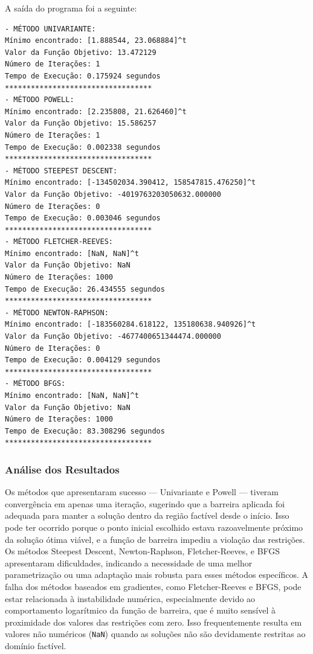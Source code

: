 \documentclass[a4paper, 12pt]{article}
\begin{document}
A saída do programa foi a seguinte:

\begin{verbatim}
- MÉTODO UNIVARIANTE:
Mínimo encontrado: [1.888544, 23.068884]^t
Valor da Função Objetivo: 13.472129
Número de Iterações: 1
Tempo de Execução: 0.175924 segundos
**********************************
- MÉTODO POWELL:
Mínimo encontrado: [2.235808, 21.626460]^t
Valor da Função Objetivo: 15.586257
Número de Iterações: 1
Tempo de Execução: 0.002338 segundos
**********************************
- MÉTODO STEEPEST DESCENT:
Mínimo encontrado: [-134502034.390412, 158547815.476250]^t
Valor da Função Objetivo: -4019763203050632.000000
Número de Iterações: 0
Tempo de Execução: 0.003046 segundos
**********************************
- MÉTODO FLETCHER-REEVES:
Mínimo encontrado: [NaN, NaN]^t
Valor da Função Objetivo: NaN
Número de Iterações: 1000
Tempo de Execução: 26.434555 segundos
**********************************
- MÉTODO NEWTON-RAPHSON:
Mínimo encontrado: [-183560284.618122, 135180638.940926]^t
Valor da Função Objetivo: -4677400651344474.000000
Número de Iterações: 0
Tempo de Execução: 0.004129 segundos
**********************************
- MÉTODO BFGS:
Mínimo encontrado: [NaN, NaN]^t
Valor da Função Objetivo: NaN
Número de Iterações: 1000
Tempo de Execução: 83.308296 segundos
**********************************
\end{verbatim}

\subsubsection{Análise dos Resultados}

Os métodos que apresentaram sucesso — Univariante e Powell — tiveram convergência em apenas uma iteração, sugerindo que a barreira aplicada foi adequada para manter a solução dentro da região factível desde o início. Isso pode ter ocorrido porque o ponto inicial escolhido estava razoavelmente próximo da solução ótima viável, e a função de barreira impediu a violação das restrições.\\

Os métodos Steepest Descent, Newton-Raphson, Fletcher-Reeves, e BFGS apresentaram dificuldades, indicando a necessidade de uma melhor parametrização ou uma adaptação mais robusta para esses métodos específicos. A falha dos métodos baseados em gradientes, como Fletcher-Reeves e BFGS, pode estar relacionada à instabilidade numérica, especialmente devido ao comportamento logarítmico da função de barreira, que é muito sensível à proximidade dos valores das restrições com zero. Isso frequentemente resulta em valores não numéricos (\texttt{NaN}) quando as soluções não são devidamente restritas ao domínio factível.\\
\end{document}
